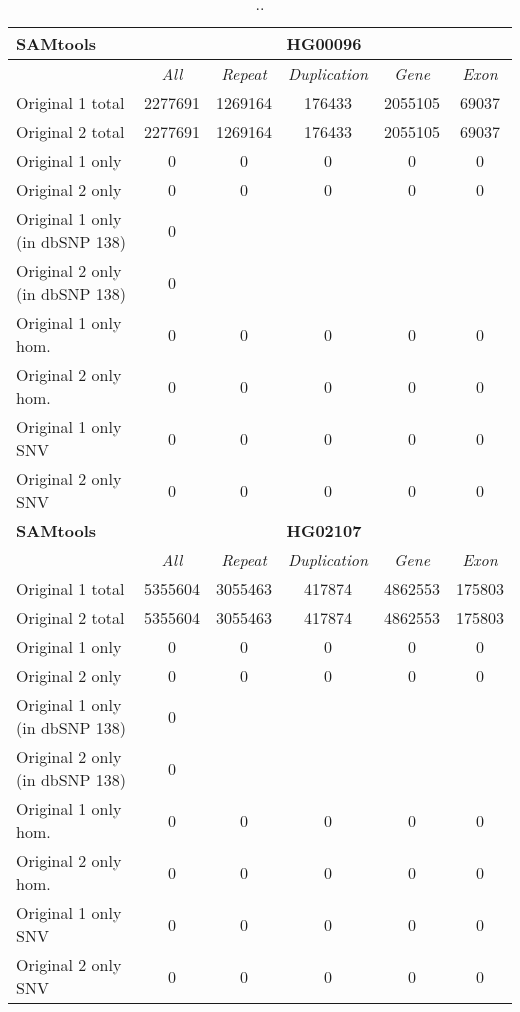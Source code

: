 \begin{table}[htb]
\caption{ .. }
\begin{center}
\begin{tabular}{|l|c||c|c|c|c|}
\hline
{\bf SAMtools} & \multicolumn{5}{|c|}{\bf HG00096} \\
\hline
\cline{2-6}
{\bf} & {\it All} & {\it Repeat} & {\it Duplication} & {\it Gene} & {\it Exon} \\
\hline
Original 1 total & 2277691 & 1269164 & 176433 & 2055105 & 69037\\ 
\hline
Original 2 total & 2277691 & 1269164 & 176433 & 2055105 & 69037\\ 
\hline
Original 1 only & 0 & 0 & 0 & 0 & 0\\ 
\hline
Original 2 only & 0 & 0 & 0 & 0 & 0\\ 
\hline
Original 1 only (in dbSNP 138) & 0 &  &  &  & \\ 
\hline
Original 2 only (in dbSNP 138) & 0 &  &  &  & \\ 
\hline
Original 1 only hom. & 0 & 0 & 0 & 0 & 0\\ 
\hline
Original 2 only hom. & 0 & 0 & 0 & 0 & 0\\ 
\hline
Original 1 only SNV & 0 & 0 & 0 & 0 & 0\\ 
\hline
Original 2 only SNV & 0 & 0 & 0 & 0 & 0\\ 
\hline
\hline
{\bf SAMtools} & \multicolumn{5}{|c|}{\bf HG02107} \\
\hline
\cline{2-6}
{\bf} & {\it All} & {\it Repeat} & {\it Duplication} & {\it Gene} & {\it Exon} \\
\hline
Original 1 total & 5355604 & 3055463 & 417874 & 4862553 & 175803\\ 
\hline
Original 2 total & 5355604 & 3055463 & 417874 & 4862553 & 175803\\ 
\hline
Original 1 only & 0 & 0 & 0 & 0 & 0\\ 
\hline
Original 2 only & 0 & 0 & 0 & 0 & 0\\ 
\hline
Original 1 only (in dbSNP 138) & 0 &  &  &  & \\ 
\hline
Original 2 only (in dbSNP 138) & 0 &  &  &  & \\ 
\hline
Original 1 only hom. & 0 & 0 & 0 & 0 & 0\\ 
\hline
Original 2 only hom. & 0 & 0 & 0 & 0 & 0\\ 
\hline
Original 1 only SNV & 0 & 0 & 0 & 0 & 0\\ 
\hline
Original 2 only SNV & 0 & 0 & 0 & 0 & 0\\ 
\hline
\end{tabular}
\end{center}
\label{tab:orig-vs-orig2-samtools}
\end{table}

